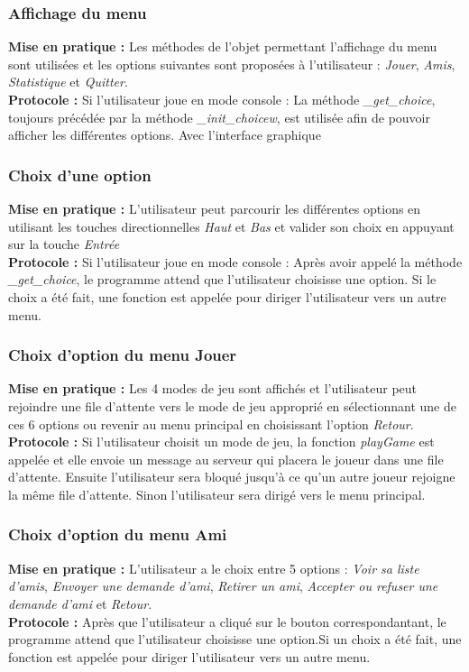 \documentclass[10pt, a4paper]{article}
\begin{document}
\subsubsection{Affichage du menu}
\textbf{Mise en pratique :} Les méthodes de l'objet permettant l'affichage du menu sont utilisées et les options suivantes sont proposées à l'utilisateur : \textit{Jouer}, \textit{Amis}, \textit{Statistique} et \textit{Quitter}.\\
\textbf{Protocole :} Si l'utilisateur joue en mode console : La méthode \textit{\_get\_choice}, toujours précédée par la méthode \textit{\_init\_choicew}, est utilisée afin de pouvoir afficher les différentes options. Avec l'interface graphique\\

\subsubsection{Choix d'une option}
\textbf{Mise en pratique :} L'utilisateur peut parcourir les différentes options en utilisant les touches directionnelles \textit{Haut} et \textit{Bas} et valider son choix en appuyant sur la touche \textit{Entrée} \\
\textbf{Protocole :} Si l'utilisateur joue en mode console :  Après avoir appelé la méthode \textit{\_get\_choice}, le programme attend que l'utilisateur choisisse une option. Si le choix a été fait, une fonction est appelée pour diriger l'utilisateur vers un autre menu.\\

\subsubsection{Choix d'option du menu Jouer}
\textbf{Mise en pratique :} Les 4 modes de jeu sont affichés et l'utilisateur peut rejoindre une file d'attente vers le mode de jeu approprié en sélectionnant une de ces 6 options ou revenir au menu principal en choisissant l'option \textit{Retour}.\\
\textbf{Protocole :} Si l'utilisateur choisit un mode de jeu, la fonction \textit{playGame} est appelée et elle envoie un message au serveur qui placera le joueur dans une file d'attente. Ensuite l'utilisateur sera bloqué jusqu'à ce qu'un autre joueur rejoigne la même file d'attente. Sinon l'utilisateur sera dirigé vers le menu principal.\\

\subsubsection{Choix d'option du menu Ami}
\textbf{Mise en pratique :} L'utilisateur a le choix entre 5 options : \textit{Voir sa liste d'amis}, \textit{Envoyer une demande d'ami}, \textit{Retirer un ami}, \textit{Accepter ou refuser une demande d'ami} et \textit{Retour}.\\
\textbf{Protocole :} Après que l'utilisateur a cliqué sur le bouton correspondantant, le programme attend que l'utilisateur choisisse une option.Si un choix a été fait, une fonction est appelée pour diriger l'utilisateur vers un autre menu. \\
\end{document}
